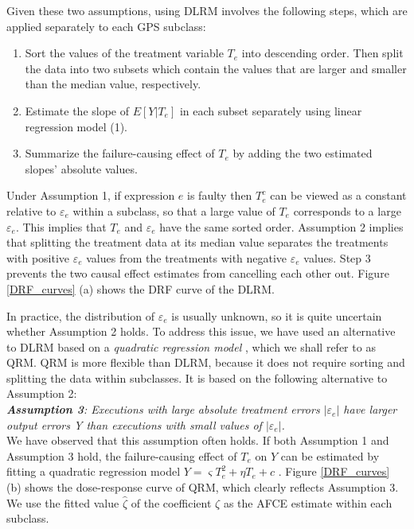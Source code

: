 Given these two assumptions, using DLRM involves the following steps, which are applied separately to each GPS subclass:
\begin{enumerate}
\item Sort the values of the treatment variable $T_e$ into descending order.  Then split the data into two subsets which contain the values that are larger and smaller than the median value, respectively.
\item 	Estimate the slope of $E[Y|T_e]$ in each subset separately using linear regression model (1).
\item 	Summarize the failure-causing effect of $T_e$ by adding the two estimated slopes’ absolute values.
\end{enumerate}
Under Assumption 1, if expression $e$ is faulty then $T_e^c$ can be viewed as a constant relative to $\varepsilon_e$ within a subclass, so that a large value of $T_e$ corresponds to a large $\varepsilon_e$.  This implies that  $T_e$   and $\varepsilon_e$ have the same sorted order. Assumption 2 implies that splitting the treatment data at its median value separates the treatments with positive $\varepsilon_e$ values from the treatments with negative $\varepsilon_e$ values.  Step 3 prevents the two causal effect estimates from cancelling each other out. Figure \ref{DRF_curves} (a) shows the DRF curve of the DLRM.

In practice, the distribution of $\varepsilon_e$  is usually unknown, so it is quite uncertain whether Assumption 2 holds.  To address this issue, we have used an alternative to DLRM based on a {\it quadratic regression model} \cite{kubavcek1996quadratic}, which we shall refer to as QRM.   QRM is more flexible than DLRM, because it does not require sorting and splitting the data within subclasses.  It is based on the following alternative to Assumption 2:\\
\newline
\textit{ \textbf{ Assumption 3}: Executions with large absolute treatment errors $\left| {{\varepsilon _e}} \right|$ have larger output errors Y than executions with small values of $\left| {{\varepsilon _e}} \right|$.}\\
\newline
We have observed that this assumption often holds.  If both Assumption 1 and Assumption 3 hold, the failure-causing effect of $T_e$ on $Y$ can be estimated by fitting a quadratic regression model $Y = \varsigma T_e^2 + \eta {T_e} + c$  . Figure \ref{DRF_curves} (b) shows the dose-response curve of QRM, which clearly reflects Assumption 3.  We use the fitted value $\hat \zeta $ of the coefficient $ \zeta $ as the AFCE estimate within each subclass.
\vspace{-0.1cm}

